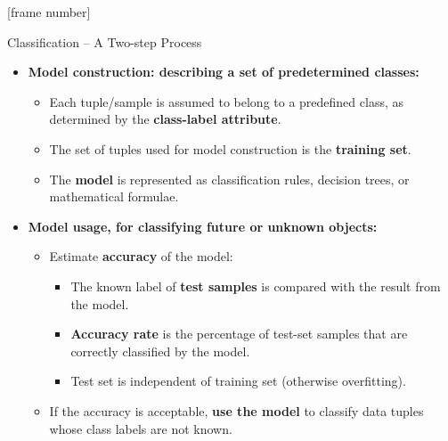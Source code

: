 \documentclass[aspectratio=169,t,table]{beamer}
\begin{document}
  {
    [frame number]
    \begin{frame}{Classification -- A Two-step Process}
        \begin{itemize}
            \item \textbf{Model construction: describing a set of predetermined classes:}
            \begin{itemize}
              \item Each tuple/sample is assumed to belong to a predefined class, as determined by the \textbf{\color{airforceblue}class-label attribute}.
              \item The set of tuples used for model construction is the \textbf{\color{airforceblue}training set}.
              \item The \textbf{\color{airforceblue}model} is represented as classification rules, decision trees, or mathematical formulae.
            \end{itemize}
            \item \textbf{Model usage, for classifying future or unknown objects:}
            \begin{itemize}
              \item Estimate \textbf{\color{airforceblue}accuracy} of the model:
              \begin{itemize}
                \item The known label of \textbf{test samples} is compared with the result from the model.
                \item \textbf{Accuracy rate} is the percentage of test-set samples that are correctly classified by the model.
                \item Test set is independent of training set (otherwise overfitting).
              \end{itemize}
              \item If the accuracy is acceptable, \textbf{\color{airforceblue}use the model} to classify data tuples whose class labels are not known.
            \end{itemize}
        \end{itemize}
    \end{frame}
  }
\end{document}
